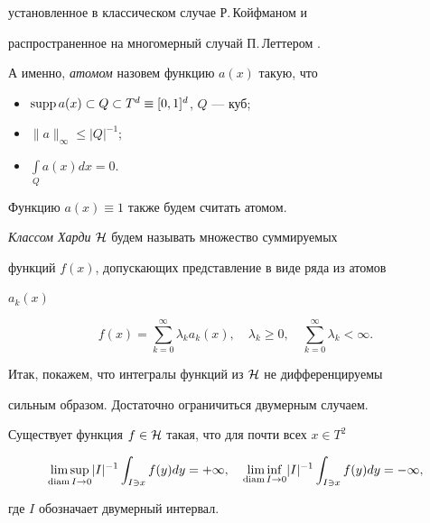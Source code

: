 установленное в классическом случае Р.\,Койфманом \cite{C5} и


распространенное на многомерный случай П.\,Леттером \cite{L6}.





А именно, {\it атомом} назовем функцию $a(x)$ такую, что


\begin{itemize}


\item[(i)] $\operatorname{supp} a(x)\subset Q\subset T^d\equiv[0,1]^d$, $Q$ --- куб;


\item[(ii)] $\|a\|_\infty\le |Q|^{-1}$;


\item[(iii)] $\int\limits_Q a(x)dx=0$.


\end{itemize}


Функцию $a(x)\equiv 1$ также будем считать атомом.





{\it Классом Харди} $\cal H$ будем называть множество суммируемых


функций $f(x)$, допускающих представление в виде ряда из атомов


$a_k(x)$


$$


f(x)=\sum^\infty_{k=0}\lambda_k a_k(x),\quad


\lambda_k\ge 0,\quad \sum^\infty_{k=0}\lambda_k<\infty.


$$





Итак, покажем, что интегралы функций из $\cal H$ не дифференцируемы


сильным образом. Достаточно ограничиться двумерным случаем.





\begin{thmnonum}


Существует функция $f\in\cal H$ такая, что для почти всех $x\in T^2$


\begin{equation}


\underset{\diam I\to 0}{\limsup}{}|I|^{-1}


\int_{I\owns x}f(y)dy=+\infty,\quad


\underset{\diam I\to 0}{\liminf}{}|I|^{-1}


\int_{I\owns x}f(y)dy=-\infty,


\end{equation}


где $I$ обозначает двумерный интервал.


\end{thmnonum}





